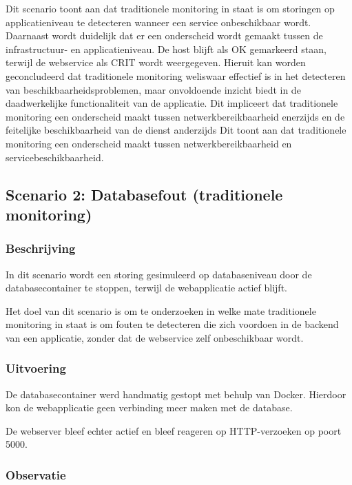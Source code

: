 Dit scenario toont aan dat traditionele monitoring in staat is om storingen op applicatieniveau te detecteren wanneer een service onbeschikbaar wordt.
Daarnaast wordt duidelijk dat er een onderscheid wordt gemaakt tussen de infrastructuur- en applicatieniveau. De host blijft als OK gemarkeerd staan, terwijl de webservice als CRIT wordt weergegeven.
Hieruit kan worden geconcludeerd dat traditionele monitoring weliswaar effectief is in het detecteren van beschikbaarheidsproblemen, maar onvoldoende inzicht biedt in de daadwerkelijke functionaliteit van de applicatie. Dit impliceert dat traditionele monitoring een onderscheid maakt tussen netwerkbereikbaarheid enerzijds en de feitelijke beschikbaarheid van de dienst anderzijds
Dit toont aan dat traditionele monitoring een onderscheid maakt tussen netwerkbereikbaarheid en servicebeschikbaarheid.




\subsection{Scenario 2: Databasefout (traditionele monitoring)}

\subsubsection{Beschrijving}

In dit scenario wordt een storing gesimuleerd op databaseniveau door de databasecontainer te stoppen, terwijl de webapplicatie actief blijft.

Het doel van dit scenario is om te onderzoeken in welke mate traditionele monitoring in staat is om fouten te detecteren die zich voordoen in de backend van een applicatie, zonder dat de webservice zelf onbeschikbaar wordt.

\subsubsection{Uitvoering}

De databasecontainer werd handmatig gestopt met behulp van Docker. Hierdoor kon de webapplicatie geen verbinding meer maken met de database.

De webserver bleef echter actief en bleef reageren op HTTP-verzoeken op poort 5000.

\subsubsection{Observatie}

